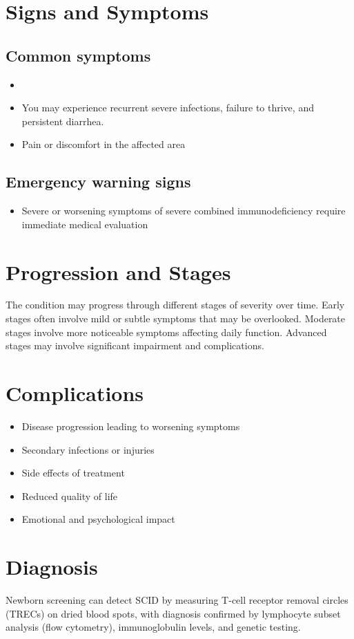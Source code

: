 \section{Signs and Symptoms}

\subsection{Common symptoms}
\begin{itemize}[noitemsep]
  \item \item You may experience recurrent severe infections, failure to thrive, and persistent diarrhea.

  \item Pain or discomfort in the affected area
  \end{itemize}

\subsection{Emergency warning signs}
\begin{itemize}[noitemsep]
  \item Severe or worsening symptoms of severe combined immunodeficiency require immediate medical evaluation
\end{itemize}
\section{Progression and Stages}
The condition may progress through different stages of severity over time. Early stages often involve mild or subtle symptoms that may be overlooked. Moderate stages involve more noticeable symptoms affecting daily function. Advanced stages may involve significant impairment and complications.
\section{Complications}
\begin{itemize}[noitemsep]
  \item Disease progression leading to worsening symptoms
  \item Secondary infections or injuries
  \item Side effects of treatment
  \item Reduced quality of life
  \item Emotional and psychological impact
\end{itemize}
\section{Diagnosis}
Newborn screening can detect SCID by measuring T-cell receptor removal circles (TRECs) on dried blood spots, with diagnosis confirmed by lymphocyte subset analysis (flow cytometry), immunoglobulin levels, and genetic testing.

